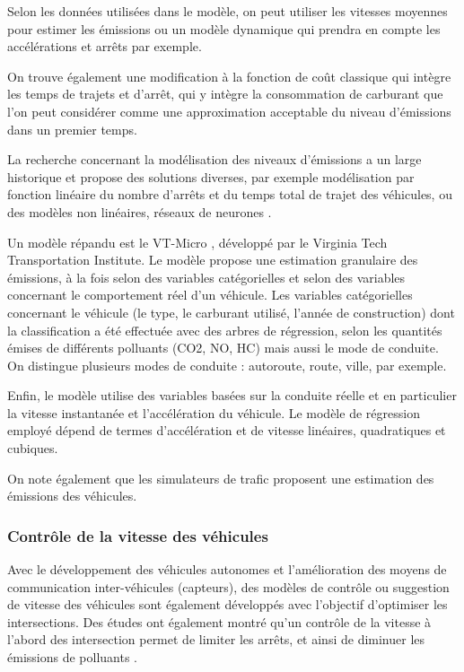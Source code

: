 \documentclass[11pt]{article}
\begin{document}
Selon les données utilisées dans le modèle, on peut utiliser les vitesses moyennes pour estimer les émissions ou un modèle dynamique qui prendra en compte les accélérations et arrêts par exemple.

On trouve également une modification à la fonction de coût classique qui intègre les temps de trajets et d'arrêt, qui y intègre la consommation de carburant que l'on peut considérer comme une approximation acceptable du niveau d'émissions dans un premier temps.

La recherche concernant la modélisation des niveaux d'émissions a un large historique et propose des solutions diverses, par exemple modélisation par fonction linéaire du nombre d'arrêts \cite{stevanovic2009optimizing} et du temps total de trajet des véhicules, ou des modèles non linéaires, réseaux de neurones \cite{fuelconsumption}.

Un modèle répandu est le VT-Micro \cite{RAKHA200449}, développé par le Virginia Tech Transportation Institute. Le modèle propose une estimation granulaire des émissions, à la fois selon des variables catégorielles et selon des variables concernant le comportement réel d'un véhicule. Les variables catégorielles concernant le véhicule (le type, le carburant utilisé, l'année de construction) dont la classification a été effectuée avec des arbres de régression, selon les quantités émises de différents polluants (CO2, NO, HC) mais aussi le mode de conduite. On distingue plusieurs modes de conduite : autoroute, route, ville, par exemple.

Enfin, le modèle utilise des variables basées sur la conduite réelle et en particulier la vitesse instantanée et l'accélération du véhicule. Le modèle de régression employé dépend de termes d'accélération et de vitesse linéaires, quadratiques et cubiques.

On note également que les simulateurs de trafic proposent une estimation des émissions des véhicules.\par

\subsubsection{Contrôle de la vitesse des véhicules}
\label{sec:org06ece78}

Avec le développement des véhicules autonomes et l'amélioration des moyens de communication inter-véhicules (capteurs), des modèles de contrôle ou suggestion de vitesse des véhicules sont également développés avec l'objectif d'optimiser les intersections.\cite{vehiclecontrol} Des études ont également montré qu'un contrôle de la vitesse à l'abord des intersection permet de limiter les arrêts, et ainsi de diminuer les émissions de polluants \cite{MATSUMOTO2019449} \cite{MATSUMOTO20141015} \cite{tielert2010}.
\end{document}
